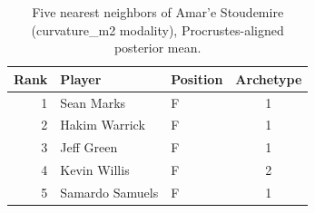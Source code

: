 \begin{table}[htbp]
  \centering\small
  \begin{tabular}{rllc}
    \toprule
    Rank & Player & Position & Archetype \\
    \midrule
    1 & Sean Marks & F & 1 \\
    2 & Hakim Warrick & F & 1 \\
    3 & Jeff Green & F & 1 \\
    4 & Kevin Willis & F & 2 \\
    5 & Samardo Samuels & F & 1 \\
    \bottomrule
  \end{tabular}
  \caption{Five nearest neighbors of Amar'e Stoudemire (curvature_m2 modality), Procrustes-aligned posterior mean.}
  \label{tab:Amar_e_Stoudemire_neighbors_curvature_m2}
\end{table}

